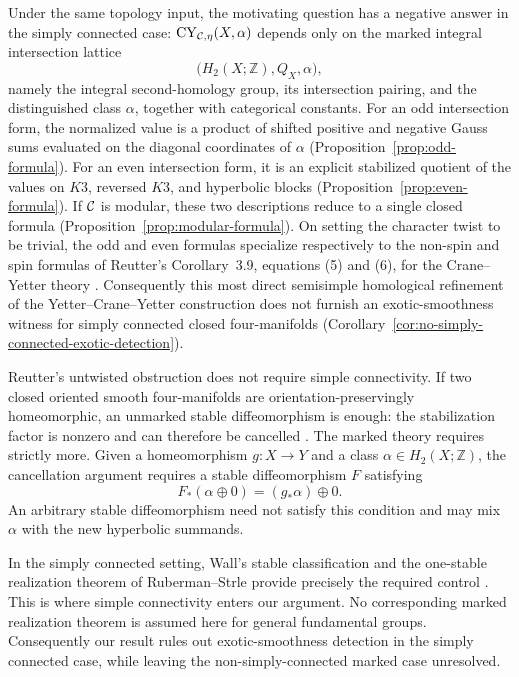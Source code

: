 Under the same topology input, the motivating question has a negative answer
in the simply connected case:
$\operatorname{CY}_{\mathcal{C},\eta}(X,\alpha)$ depends only on the
marked integral intersection lattice
\[
  \bigl(H_2(X;\mathbb Z),Q_X,\alpha\bigr),
\]
namely the integral second-homology group, its intersection pairing, and the
distinguished class $\alpha$, together with categorical constants.  For an odd
intersection form, the normalized value is a product of shifted positive and
negative Gauss sums evaluated on the diagonal coordinates of $\alpha$
(Proposition~\ref{prop:odd-formula}).  For an even intersection form, it is an
explicit stabilized quotient of the values on $K3$, reversed $K3$, and
hyperbolic blocks (Proposition~\ref{prop:even-formula}).  If $\mathcal{C}$ is modular,
these two descriptions reduce to a single closed formula
(Proposition~\ref{prop:modular-formula}).  On setting the character twist to
be trivial, the odd and even formulas specialize respectively to the non-spin
and spin formulas of Reutter's Corollary~3.9, equations (5) and (6), for the
Crane--Yetter theory \cite{Reutter2023}.
Consequently this most direct semisimple homological refinement of the
Yetter--Crane--Yetter construction does not furnish an exotic-smoothness
witness for simply connected closed four-manifolds
(Corollary~\ref{cor:no-simply-connected-exotic-detection}).

Reutter's untwisted obstruction does not require simple connectivity.  If two
closed oriented smooth four-manifolds are orientation-preservingly
homeomorphic, an unmarked stable diffeomorphism is enough: the stabilization
factor is nonzero and can therefore be cancelled \cite{Reutter2023}.  The
marked theory requires strictly more.  Given a homeomorphism
$g\colon X\to Y$ and a class $\alpha\in H_2(X;\mathbb Z)$, the cancellation
argument requires a stable diffeomorphism $F$ satisfying
\[
  F_*(\alpha\oplus0)=(g_*\alpha)\oplus0.
\]
An arbitrary stable diffeomorphism need not satisfy this condition and may mix
$\alpha$ with the new hyperbolic summands.

In the simply connected setting, Wall's stable classification and the
one-stable realization theorem of Ruberman--Strle provide precisely the
required control \cite{Wall1964,RubermanStrle2022}.  This is where simple
connectivity enters our argument.  No corresponding marked realization
theorem is assumed here for general fundamental groups.  Consequently our
result rules out exotic-smoothness detection in the simply connected case,
while leaving the non-simply-connected marked case unresolved.

